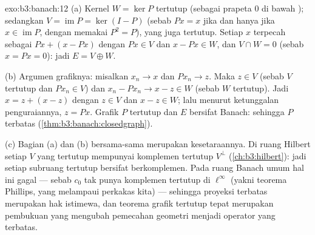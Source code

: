 \begin{solution}{exo:b3:banach:12}
(a) Kernel $W = \ker P$ tertutup (sebagai prapeta $0$ di bawah
); sedangkan $V = \operatorname{im}P = \ker(I - P)$
(sebab $Px = x$ jika dan hanya jika $x \in \operatorname{im}P$, dengan memakai $P^2 =
P$), yang juga tertutup. Setiap $x$ terpecah sebagai $Px + (x - Px)$
dengan $Px \in V$ dan $x - Px \in W$, dan $V \cap W = 0$ (sebab $x = Px
= 0$): jadi $E = V \oplus W$.

(b) Argumen grafiknya: misalkan $x_n \to x$ dan $Px_n \to z$.
Maka $z \in V$ (sebab $V$ tertutup dan $Px_n \in V$) dan $x_n - Px_n \to
x - z \in W$ (sebab $W$ tertutup). Jadi $x = z + (x - z)$ dengan $z \in
V$ dan $x - z \in W$; lalu menurut ketunggalan penguraiannya, $z =
Px$. Grafik $P$ tertutup dan $E$ bersifat Banach: sehingga $P$
terbatas (\cref{thm:b3:banach:closedgraph}).

(c) Bagian (a) dan (b) bersama-sama merupakan kesetaraannya. Di ruang Hilbert
setiap $V$ yang tertutup mempunyai komplemen tertutup $V^\perp$
(\cref{ch:b3:hilbert}): jadi setiap subruang tertutup bersifat
berkomplemen. Pada ruang Banach umum hal ini gagal --- sebab $c_0$
tak punya komplemen tertutup di $\ell^\infty$ (yakni teorema
Phillips, yang melampaui perkakas kita) --- sehingga proyeksi terbatas merupakan
hak istimewa, dan teorema grafik tertutup tepat merupakan
pembukuan yang mengubah pemecahan geometri menjadi operator yang terbatas.
\end{solution}

